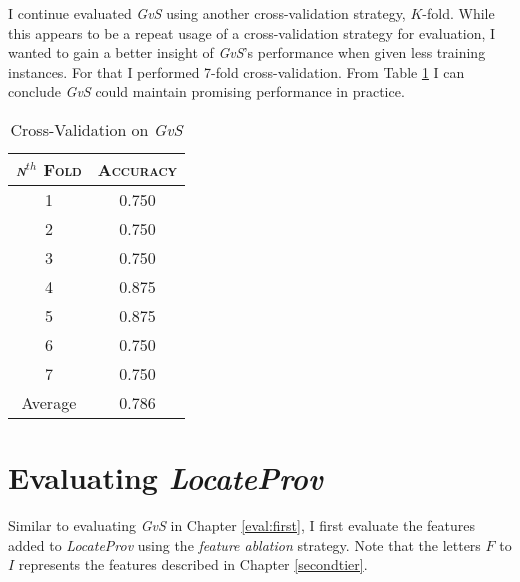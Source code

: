 I continue evaluated {\it GvS} using another cross-validation strategy, $K$-fold. While this appears to be a repeat usage of a cross-validation strategy for evaluation, I wanted to gain a better insight of {\it GvS}'s performance when given less training instances. For that I performed 7-fold cross-validation. From Table \ref{tab:crossvalidation} I can conclude {\it GvS} could maintain promising performance in practice.
\begin{table}[h]
	\center
	\begin{tabular}{ c c }
		\textsc{{\it n}$^{th}$ Fold} & \textsc{Accuracy} \\
		\hline
		1 & 0.750 \\
		2 & 0.750 \\
		3 & 0.750 \\
		4 & 0.875 \\
		5 & 0.875 \\
		6 & 0.750 \\
		7 & 0.750 \\
		Average & 0.786 \\
	\end{tabular}
	\caption{Cross-Validation on {\it GvS}}
	\label{tab:crossvalidation}
\end{table}


\section{Evaluating {\it LocateProv}}
\label{eval:second}
Similar to evaluating {\it GvS} in Chapter \ref{eval:first}, I first evaluate the features added to {\it LocateProv} using the {\it feature ablation} strategy. Note that the letters $F$ to $I$ represents the features described in Chapter \ref{secondtier}.

